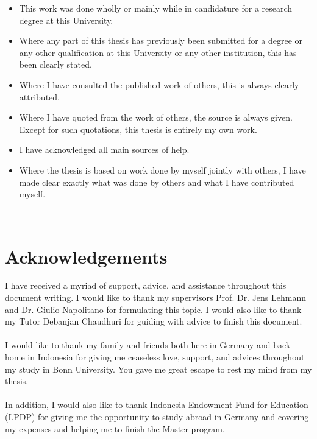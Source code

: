 \documentclass[a4paper,12pt]{report}
\begin{document}
\begin{itemize}
	\item This work was done wholly or mainly while in candidature for
	a research degree at this University.
	\item Where any part of this thesis has previously been submitted for a degree
	or any other qualification at this University or any other institution,
	this has been clearly stated.
	\item Where I have consulted the published work of others, this is always
	clearly attributed.
	\item Where I have quoted from the work of others, the source is always
	given. Except for such quotations, this thesis is entirely my own work.
	\item I have acknowledged all main sources of help.
	\item Where the thesis is based on work done by myself jointly with others,
	I have made clear exactly what was done by others and what I have
	contributed myself.
\end{itemize}

\vskip5mm
\underline{}\\

\underline{}


\chapter*{Acknowledgements}
I have received a myriad of support, advice, and assistance throughout
this document writing. I would like to thank my supervisors Prof. Dr.
Jens Lehmann and Dr. Giulio Napolitano for formulating this topic. I
would also like to thank my Tutor Debanjan Chaudhuri for guiding with
advice to finish this document. \\~\\
I would like to thank my family and friends both here in Germany and
back home in Indonesia for giving me ceaseless love, support, and
advices throughout my study in Bonn University. You gave me great
escape to rest my mind from my thesis.
\\~\\
In addition, I would also like to thank Indonesia Endowment Fund for
Education (LPDP) for giving me the opportunity to study abroad in
Germany and covering my expenses and helping me to finish the Master
program.
\end{document}
